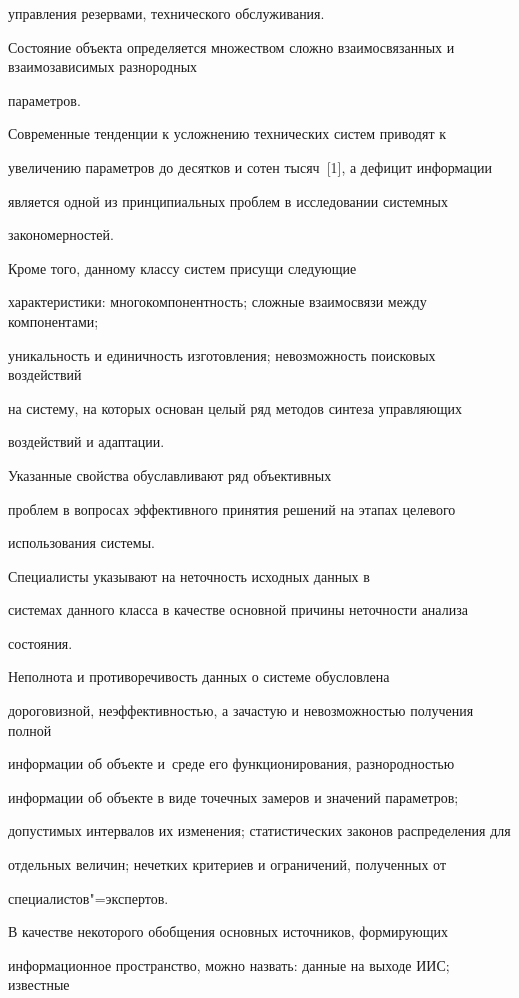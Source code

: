 управления резервами, технического обслуживания.

Состояние объекта определяется множеством сложно взаимосвязанных и взаимозависимых разнородных

параметров.

Современные тенденции к усложнению технических систем приводят к

увеличению параметров до десятков и сотен тысяч~[1], а дефицит информации

является одной из принципиальных проблем в исследовании системных

закономерностей.

Кроме того, данному классу систем присущи следующие

характеристики: многокомпонентность; сложные взаимосвязи между компонентами;

уникальность и единичность изготовления; невозможность поисковых воздействий

на систему, на которых основан целый ряд методов синтеза управляющих

воздействий и адаптации.

Указанные свойства обуславливают ряд объективных

проблем в вопросах эффективного принятия решений на этапах целевого

использования системы.

Специалисты указывают на неточность исходных данных в

системах данного класса в качестве основной причины неточности анализа

состояния.

Неполнота и противоречивость данных о системе обусловлена

дороговизной, неэффективностью, а зачастую и невозможностью получения полной

информации об объекте и~среде его функционирования, разнородностью

информации об объекте в виде точечных замеров и значений параметров;

допустимых интервалов их изменения; статистических законов распределения для

отдельных величин; нечетких критериев и ограничений, полученных от

специалистов"=экспертов.



В качестве некоторого обобщения основных источников, формирующих

информационное пространство, можно назвать: данные на выходе ИИС; известные

